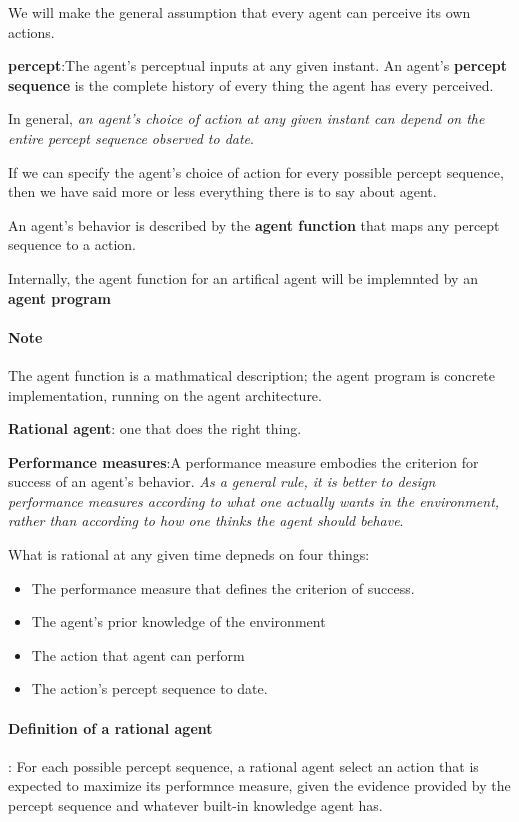 We will make the general assumption that every agent can perceive its own
actions.

\textbf{percept}:The agent's perceptual inputs at any given instant. An agent's
\textbf{percept sequence} is the complete history of every thing the agent has
every perceived.

In general, \emph{an agent's choice of action at any given instant can depend on
the entire percept sequence observed to date}. 

If we can specify the agent's choice of action for every possible percept
sequence, then we have said more or less everything there is to say about agent.

An agent's behavior is described by the \textbf{agent function} that maps any
percept sequence to a action.

Internally, the agent function for an artifical agent will be implemnted by an
\textbf{agent program}

\paragraph{Note} The agent function is a mathmatical description; the agent
program is concrete implementation, running on the agent architecture.

\textbf{Rational agent}: one that does the right thing.

\textbf{Performance measures}:A performance measure embodies the criterion for
success of an agent's behavior. \emph{As a general rule, it is better to design
performance measures according to what one actually wants in the environment,
rather than according to how one thinks the agent should behave}.

What is rational at any given time depneds on four things:
\begin{itemize}
\item The performance measure that defines the criterion of success.
\item The agent's prior knowledge of the environment
\item The action that agent can perform
\item The action's percept sequence to date.
\end{itemize}
\paragraph{Definition of a rational agent}: For each possible percept sequence,
a rational agent select an action that is expected to maximize its performnce
measure, given the evidence provided by the percept sequence and whatever
built-in knowledge agent has.

